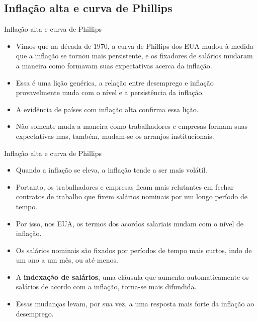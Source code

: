 \documentclass[10pt]{beamer}
\begin{document}
\subsection{Inflação alta e curva de Phillips}
\begin{frame}{Inflação alta e curva de Phillips}
    \begin{itemize}
        \item Vimos que na década de 1970, a curva de Phillips dos EUA mudou à medida que a inflação se tornou mais persistente, e os fixadores de salários mudaram a maneira como formavam suas expectativas acerca da inflação.
        \bigskip
        \item Essa é uma lição genérica, a relação entre desemprego e inflação provavelmente muda com o nível e a persistência da inflação.
        \bigskip
        \item A evidência de países com inflação alta confirma essa lição.
        \bigskip
        \item Não somente muda a maneira como trabalhadores e empresas formam suas expectativas mas, também, mudam-se os arranjos institucionais.
    \end{itemize}
\end{frame}

\begin{frame}{Inflação alta e curva de Phillips}
    \begin{itemize}
        \item Quando a inflação se eleva, a inflação tende a ser mais volátil.
        \bigskip
        \item Portanto, os trabalhadores e empresas ficam mais relutantes em fechar contratos de trabalho que fixem salários nominais por um longo período de tempo.
        \bigskip
        \item Por isso, nos EUA, os termos dos acordos salariais mudam com o nível de inflação.
        \bigskip
        \item Os salários nominais são fixados por períodos de tempo mais curtos, indo de um ano a um mês, ou até menos.
        \bigskip
        \item A \textbf{indexação de salários}, uma cláusula que aumenta automaticamente os salários de acordo com a inflação, torna-se mais difundida.
        \bigskip
        \item Essas mudanças levam, por sua vez, a uma resposta mais forte da inflação ao desemprego.
    \end{itemize}
\end{frame}
\end{document}
